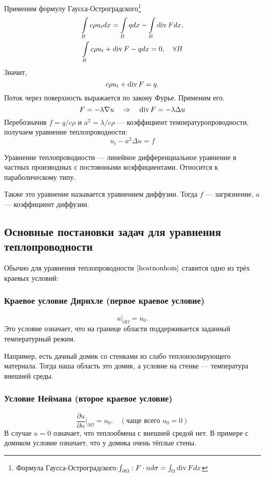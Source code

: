 Применим формулу Гаусса-Остроградского\footnote{Формула Гаусса-Остроградского:$
    \int_{\partial \Omega}: F \cdot n d\sigma = \int_{\Omega} \operatorname{div} F dx$}
\begin{gather*}
    \int \limits_B c \rho u_t dx = \int \limits_B q dx - \int \limits_B \operatorname{div} F dx, \\
    \int \limits_B c \rho u_t + \operatorname{div} F - q dx = 0,\quad \forall B
\end{gather*}
Значит,
$$ c \rho u_t + \operatorname{div} F = q.$$
Поток через поверхность выражается по закону Фурье. Применим его.
$$ F = - \lambda \nabla u \quad \Rightarrow \quad \operatorname{div} F = - \lambda \Delta u$$
Перебозначив $f = q/c\rho$ и $ a^2 = \lambda / c \rho $ --- коэффициент температуропроводности, получаем уравнение теплопроводности:
\begin{equation}
	u_t - a^2 \Delta u = f
\label{heatnonhom}
\end{equation}

Уравнение теплопроводности --- линейное дифференциальное уравнение в частных производных с постоянными коэффициентами. Относится к параболическому типу.

Также это уравнение называется уравнением диффузии. Тогда $f$ --- загрязнение, $a$ --- коэффициент диффузии.

\subsection{Основные постановки задач для уравнения теплопроводности}
Обычно для уравнения теплопроводности $\eqref{heatnonhom}$ ставится одно из трёх краевых условий:

\subsubsection{Краевое условие Дирихле (первое краевое условие)}
$$u \Bigg \rvert_{\partial\Omega} = u_0.$$
Это условие означает, что на границе области поддерживается заданный температурный режим.

Например, есть дачный домик со стенками из слабо теплоизолирующего материала. Тогда наша область это домик, а условие на стенке --- температура внешней среды.

\subsubsection{Условие Неймана (второе краевое условие)}
$$\dfrac{\partial u}{\partial n}\Bigg\rvert_{\partial\Omega} = u_0.\quad (\text{чаще всего }u_0 = 0)$$
В случае $u = 0$ означает, что теплообмена с внешней средой нет. В примере с домиком условие означает, что у домика очень тёплые стены.

